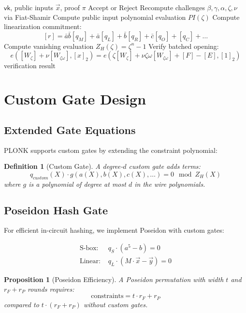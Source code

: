 \documentclass[11pt,a4paper]{article}
\newtheorem{definition}[theorem]{Definition}
\newtheorem{proposition}[theorem]{Proposition}
\begin{document}
\begin{algorithm}
\caption{PLONK Verifier}
\label{alg:plonk-verify}
\begin{algorithmic}[1]
\Require $\mathsf{vk}$, public inputs $\vec{x}$, proof $\pi$
\Ensure Accept or Reject
\State Recompute challenges $\beta, \gamma, \alpha, \zeta, \nu$ via Fiat-Shamir
\State Compute public input polynomial evaluation $PI(\zeta)$
\State Compute linearization commitment:
\[
[r] = \bar{a}\bar{b}[q_M] + \bar{a}[q_L] + \bar{b}[q_R] + \bar{c}[q_O] + [q_C] + \ldots
\]
\State Compute vanishing evaluation $Z_H(\zeta) = \zeta^n - 1$
\State Verify batched opening:
\[
e([W_\zeta] + \nu[W_{\zeta\omega}], [x]_2) = e(\zeta[W_\zeta] + \nu\zeta\omega[W_{\zeta\omega}] + [F] - [E], [1]_2)
\]
\State \Return verification result
\end{algorithmic}
\end{algorithm}

\section{Custom Gate Design}
\label{sec:custom-gates}

\subsection{Extended Gate Equations}

PLONK supports custom gates by extending the constraint polynomial:

\begin{definition}[Custom Gate]
A degree-$d$ custom gate adds terms:
\[
q_{custom}(X) \cdot g(a(X), b(X), c(X), \ldots) = 0 \mod Z_H(X)
\]
where $g$ is a polynomial of degree at most $d$ in the wire polynomials.
\end{definition}

\subsection{Poseidon Hash Gate}

For efficient in-circuit hashing, we implement Poseidon \cite{poseidon} with custom gates:

\begin{align*}
\text{S-box: } & q_S \cdot (a^5 - b) = 0 \\
\text{Linear: } & q_L \cdot (M \cdot \vec{x} - \vec{y}) = 0
\end{align*}

\begin{proposition}[Poseidon Efficiency]
A Poseidon permutation with width $t$ and $r_F + r_P$ rounds requires:
\[
\text{constraints} = t \cdot r_F + r_P
\]
compared to $t \cdot (r_F + r_P)$ without custom gates.
\end{proposition}
\end{document}
